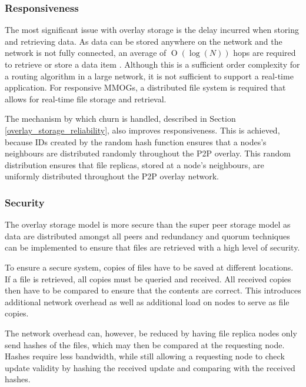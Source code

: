 \documentclass[10pt,a4paper,journal,cspaper,compsoc]{IEEEtran}
\providecommand{\OO}[1]{\operatorname{O}\left(#1\right)}
\begin{document}
\subsubsection{Responsiveness}

The most significant issue with overlay storage is the delay incurred when storing and retrieving data. As data can be stored anywhere on the network
and the network is not fully connected, an average of $\OO{\log(N)}$ hops are required to retrieve or store a data item
\cite{storage_and_chaching_PAST}. Although this is a sufficient order complexity for a routing algorithm in a large network, it is not sufficient to
support a real-time application. For responsive MMOGs, a distributed file system is required that allows for real-time file storage and retrieval.

The mechanism by which churn is handled, described in Section \ref{overlay_storage_reliability}, also improves responsiveness.  This is achieved,
because IDs created by the random hash function ensures that a nodes's neighbours are distributed randomly throughout the P2P overlay. This random
distribution ensures that file replicas, stored at a node's neighbours, are uniformly distributed throughout the P2P overlay network.


\subsubsection{Security}
The overlay storage model is more secure than the super peer storage model as data are distributed amongst all peers and redundancy and quorum
techniques can be implemented to ensure that files are retrieved with a high level of security.

To ensure a secure system, copies of files have to be saved at different locations. If a file is retrieved, all copies must be queried and received.
All received copies then have to be compared to ensure that the contents are correct. This introduces additional network overhead as well as
additional load on nodes to serve as file copies.

The network overhead can, however, be reduced by having file replica nodes only send hashes of the files, which may then be compared at the
requesting node. Hashes require less bandwidth, while still allowing a requesting node to check update validity by hashing the received update and
comparing with the received hashes.
\end{document}
